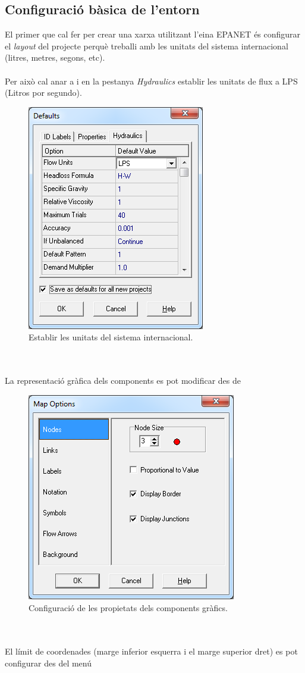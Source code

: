 \documentclass[12pt]{article}
\begin{document}
\subsection{Configuració bàsica de l'entorn}
El primer que cal fer per crear una xarxa utilitzant l'eina EPANET és configurar el \textit{layout} del projecte perquè treballi amb les unitats del sistema internacional (litres, metres, segons, etc).
\\\\Per això cal anar a  i en la pestanya \textit{Hydraulics} establir les unitats de flux a LPS (Litros por segundo).
\begin{figure}[h!]
	\centering
	\includegraphics[scale=.7]{imatges/epanet/1.png}
	\caption{Establir les unitats del sistema internacional.}
\end{figure}
\\\\La representació gràfica dels components es pot modificar des de 
\begin{figure}[h!]
	\centering
	\includegraphics[scale=.7]{imatges/epanet/2.png}
	\caption{Configuració de les propietats dels components gràfics.}
\end{figure}
\\\\El límit de coordenades (marge inferior esquerra i el marge superior dret) es pot configurar des del menú 
\end{document}
